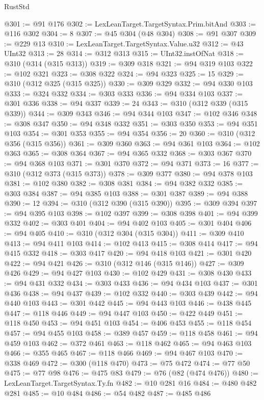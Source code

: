 \begin{lexlean}{RustStd}
\begin{coremodule}
@301 := @91 @176
@302 := LexLeanTarget.TargetSyntax.Prim.bitAnd
@303 := @116 @302
@304 := 8
@307 := @45 @304 (@48 @304)
@308 := @91 @307
@309 := @229 @13
@310 := LexLeanTarget.TargetSyntax.Value.u32
@312 := @43 UInt32
@313 := 28
@314 := @312 @313
@315 := UInt32.instOfNat
@318 := @310 (@314 (@315 @313))
@319 := @309 @318
@321 := @94 @319 @103
@322 := @102 @321
@323 := @308 @322
@324 := @94 @323
@325 := 15
@329 := @310 (@312 @325 (@315 @325))
@330 := @309 @329
@332 := @94 @330 @103
@333 := @324 @332
@334 := @303 @333
@336 := @94 @334 @103
@337 := @301 @336
@338 := @94 @337
@339 := 24
@343 := @310 (@312 @339 (@315 @339))
@344 := @309 @343
@346 := @94 @344 @103
@347 := @102 @346
@348 := @308 @347
@350 := @94 @348 @332
@351 := @303 @350
@353 := @94 @351 @103
@354 := @301 @353
@355 := @94 @354
@356 := 20
@360 := @310 (@312 @356 (@315 @356))
@361 := @309 @360
@363 := @94 @361 @103
@364 := @102 @363
@365 := @308 @364
@367 := @94 @365 @332
@368 := @303 @367
@370 := @94 @368 @103
@371 := @301 @370
@372 := @94 @371
@373 := 16
@377 := @310 (@312 @373 (@315 @373))
@378 := @309 @377
@380 := @94 @378 @103
@381 := @102 @380
@382 := @308 @381
@384 := @94 @382 @332
@385 := @303 @384
@387 := @94 @385 @103
@388 := @301 @387
@389 := @94 @388
@390 := 12
@394 := @310 (@312 @390 (@315 @390))
@395 := @309 @394
@397 := @94 @395 @103
@398 := @102 @397
@399 := @308 @398
@401 := @94 @399 @332
@402 := @303 @401
@404 := @94 @402 @103
@405 := @301 @404
@406 := @94 @405
@410 := @310 (@312 @304 (@315 @304))
@411 := @309 @410
@413 := @94 @411 @103
@414 := @102 @413
@415 := @308 @414
@417 := @94 @415 @332
@418 := @303 @417
@420 := @94 @418 @103
@421 := @301 @420
@422 := @94 @421
@426 := @310 (@312 @146 (@315 @146))
@427 := @309 @426
@429 := @94 @427 @103
@430 := @102 @429
@431 := @308 @430
@433 := @94 @431 @332
@434 := @303 @433
@436 := @94 @434 @103
@437 := @301 @436
@438 := @94 @437
@439 := @102 @332
@440 := @303 @439
@442 := @94 @440 @103
@443 := @301 @442
@445 := @94 @443 @103
@446 := @438 @445
@447 := @118 @446
@449 := @94 @447 @103
@450 := @422 @449
@451 := @118 @450
@453 := @94 @451 @103
@454 := @406 @453
@455 := @118 @454
@457 := @94 @455 @103
@458 := @389 @457
@459 := @118 @458
@461 := @94 @459 @103
@462 := @372 @461
@463 := @118 @462
@465 := @94 @463 @103
@466 := @355 @465
@467 := @118 @466
@469 := @94 @467 @103
@470 := @338 @469
@472 := @300 (@118 @470)
@473 := @75 @472
@474 := @77 @50
@475 := @77 @98
@476 := @475 @83
@479 := @76 (@82 (@474 @476))
@480 := LexLeanTarget.TargetSyntax.Ty.fn
@482 := @10 @281 @16
@484 := @480 @482 @281
@485 := @10 @484
@486 := @54 @482
@487 := @485 @486

\end{coremodule}
\end{lexlean}

